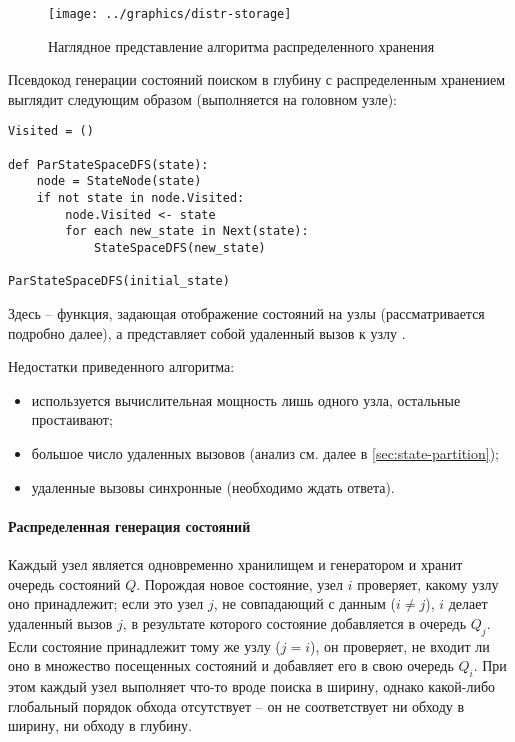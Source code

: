 \begin{figure}[!htb]
  \centering
  \texttt{[image: ../graphics/distr-storage]}
  \caption{Наглядное представление алгоритма распределенного хранения}
  \label{fig:distr-storage}
\end{figure}

Псевдокод генерации состояний поиском в глубину с распределенным хранением выглядит
следующим образом (выполняется на головном узле):

\begin{lstlisting}[style=pseudocode]
Visited = ()

def ParStateSpaceDFS(state):
    node = StateNode(state)
    if not state in node.Visited:
        node.Visited <- state
        for each new_state in Next(state):
            StateSpaceDFS(new_state)

ParStateSpaceDFS(initial_state)
\end{lstlisting}

Здесь  -- функция, задающая отображение состояний на узлы (рассматривается
подробно далее), а  представляет собой удаленный вызов к узлу
.

Недостатки приведенного алгоритма:
\begin{itemize}
\item используется вычислительная мощность лишь одного узла, остальные простаивают;
\item большое число удаленных вызовов (анализ см. далее в \ref{sec:state-partition});
\item удаленные вызовы синхронные (необходимо ждать ответа).
\end{itemize}

\paragraph{Распределенная генерация состояний}
\label{sec:distr-generation}

Каждый узел является одновременно хранилищем и генератором и хранит очередь состояний
$Q$. Порождая новое состояние, узел $i$ проверяет, какому узлу оно принадлежит; если это
узел $j$, не совпадающий с данным ($i \neq j$), $i$ делает удаленный вызов $j$, в
результате которого состояние добавляется в очередь $Q_j$. Если состояние принадлежит тому
же узлу ($j = i$), он проверяет, не входит ли оно в множество посещенных состояний
 и добавляет его в свою очередь $Q_i$. При этом каждый узел выполняет что-то
вроде поиска в ширину, однако какой-либо глобальный порядок обхода отсутствует -- он не
соответствует ни обходу в ширину, ни обходу в глубину.

